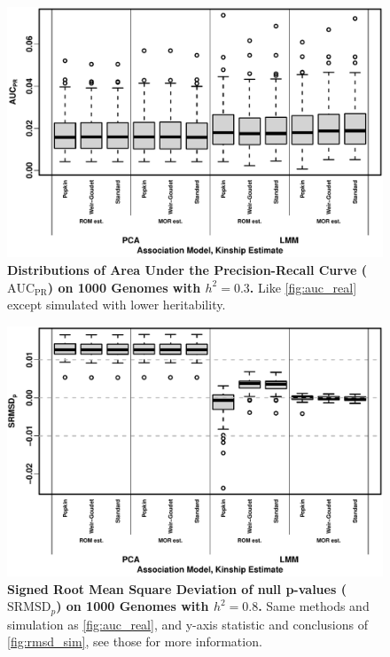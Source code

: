 \documentclass[11pt]{article}
\newcommand{\rmsd}{\text{SRMSD}_p}
\newcommand{\auc}{\text{AUC}_\text{PR}}
\begin{document}
\begin{figure}[bp!]
  \centering
  \includegraphics[width=\textwidth]{tgp-nygc-autosomes_ld_prune_1000kb_0.3_maf-0.01/h-0.3/auc.pdf}
  \caption{
    {\bf Distributions of Area Under the Precision-Recall Curve ($\auc$) on 1000 Genomes with $h^2=0.3$.}
    Like \cref{fig:auc_real} except simulated with lower heritability.
  }
  \label{fig:auc_real-h3}
\end{figure}

\begin{figure}[hp!]
  \centering
  \includegraphics[width=\textwidth]{tgp-nygc-autosomes_ld_prune_1000kb_0.3_maf-0.01/rmsd.pdf}
  \caption{
    {\bf Signed Root Mean Square Deviation of null p-values ($\rmsd$) on 1000 Genomes with $h^2=0.8$.}
    Same methods and simulation as \cref{fig:auc_real}, and y-axis statistic and conclusions of \cref{fig:rmsd_sim}, see those for more information.
  }
  \label{fig:rmsd_real}
\end{figure}
\end{document}
